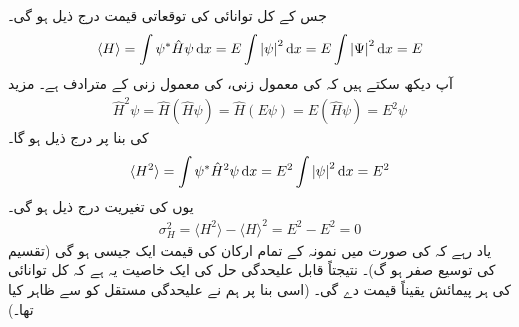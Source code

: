 جس کے کل توانائی کی توقعاتی قیمت درج ذیل ہو گی۔ 
\begin{align}
\langle H \rangle = \int \psi^{*} \hat{H}\psi \dif x = E \int \left| \psi \right|^{2} \dif x = E \int \left| \Psi \right|^{2} \dif x = E
\end{align}
آپ دیکھ سکتے ہیں کہ  کی معمول زنی،  کی معمول زنی کے مترادف ہے۔ مزید
\begin{align*}
\hat{H}^{2} \psi = \hat{H} (\hat{H}\psi ) = \hat{H} ( E\psi ) = E (\hat{H} \psi ) = E^{2} \psi 
\end{align*}
کی بنا پر درج ذیل ہو گا۔
\begin{align*}
\langle H^{2} \rangle = \int \psi^{*} \hat{H}^{2} \psi \dif x = E^{2} \int \left| \psi \right|^{2} \dif x = E^{2}
\end{align*}
یوں کی تغیریت درج ذیل ہو گی۔ 
\begin{align}
\sigma^{2}_{H} = \langle H^{2} \rangle - \langle H \rangle^{2} =E^{2} - E^{2} = 0
\end{align}
یاد رہے کہ  کی صورت میں نمونہ کے تمام ارکان کی قیمت ایک جیسی ہو گی (تقسیم کی توسیع صفر ہو گ)۔ نتیجتاً قابل علیحدگی حل کی ایک خاصیت یہ ہے کہ کل توانائی کی ہر پیمائش یقیناً قیمت  دے گی۔ (اسی بنا پر ہم نے علیحدگی مستقل کو  سے ظاہر کیا تھا۔) 

